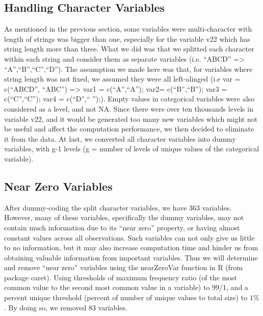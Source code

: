 \documentclass[paper=a4, fontsize=11pt]{scrartcl} %
\numberwithin{equation}{section} %
\numberwithin{figure}{section} %
\numberwithin{table}{section} %
\begin{document}
\subsection{Handling Character Variables}
As mentioned in the previous section, some variables were multi-character with length of strings was bigger than one, especially for the variable v22 which has string length more than three. What we did was that we splitted each character within each string and consider them as separate variables (i.e. \enquote{ABCD} => \enquote{A},\enquote{B},\enquote{C},\enquote{D}). The assumption we made here was that, for variables where string length was not fixed, we assumed they were all left-alinged (i.e var = c(\enquote{ABCD}, \enquote{ABC}) => var1 = c(\enquote{A},\enquote{A}); var2= c(\enquote{B},\enquote{B}); var3 = c(\enquote{C},\enquote{C}); var4 = c(\enquote{D},\enquote{ });). Empty values in categorical variables were also considered as a level, and not NA.
Since there were over ten thousands levels in variable v22, and it would be generated too many new variables which might not be useful and affect the computation performance, we then decided to eliminate it from the data. At last, we converted all character variables into dummy variables, with g-1 levels (g = number of levels of unique values of the categorical variable).
\subsection{Near Zero Variables}
After dummy-coding the split character variables, we have 363 variables. However, many of these variables, specifically the dummy variables, may not contain much information due to its \enquote{near zero} property, or having almost constant values across all observations. Such variables can not only give us little to no information, but it may also increase computation time and hinder us from obtaining valuable information from important variables. Thus we will determine and remove \enquote{near zero} variables using the nearZeroVar function in R (from package caret). Using thresholds of maximum frequency ratio (of the most common value to the second most common value in a variable) to 99/1, and a percent unique threshold (percent of number of unique values to total size) to $1\%$. By doing so, we removed 83 variables.
\end{document}
